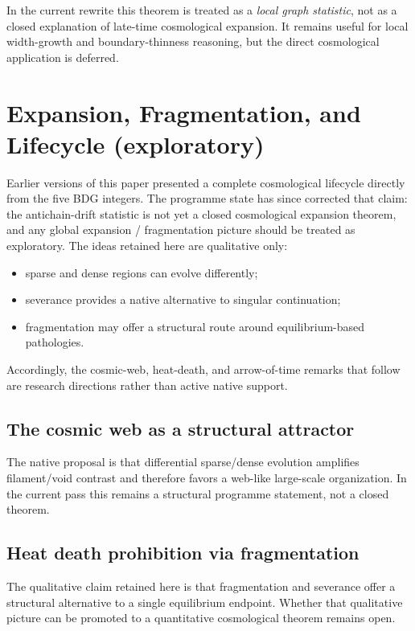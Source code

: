 \documentclass[11pt]{article}
\begin{document}
In the current rewrite this theorem is treated as a \emph{local graph statistic}, not as a closed explanation of late-time cosmological expansion. It remains useful for local width-growth and boundary-thinness reasoning, but the direct cosmological application is deferred.

\section{Expansion, Fragmentation, and Lifecycle (exploratory)}
\label{sec:lifecycle}

Earlier versions of this paper presented a complete cosmological lifecycle directly from the five BDG integers. The programme state has since corrected that claim: the antichain-drift statistic is not yet a closed cosmological expansion theorem, and any global expansion / fragmentation picture should be treated as exploratory. The ideas retained here are qualitative only:
\begin{itemize}[nosep]
    \item sparse and dense regions can evolve differently;
    \item severance provides a native alternative to singular continuation;
    \item fragmentation may offer a structural route around equilibrium-based pathologies.
\end{itemize}
Accordingly, the cosmic-web, heat-death, and arrow-of-time remarks that follow are research directions rather than active native support.

\subsection{The cosmic web as a structural attractor}
\label{sec:cosmic_web}

The native proposal is that differential sparse/dense evolution amplifies filament/void contrast and therefore favors a web-like large-scale organization. In the current pass this remains a structural programme statement, not a closed theorem.

\subsection{Heat death prohibition via fragmentation}
\label{sec:heat_death}

The qualitative claim retained here is that fragmentation and severance offer a structural alternative to a single equilibrium endpoint. Whether that qualitative picture can be promoted to a quantitative cosmological theorem remains open.
\end{document}
